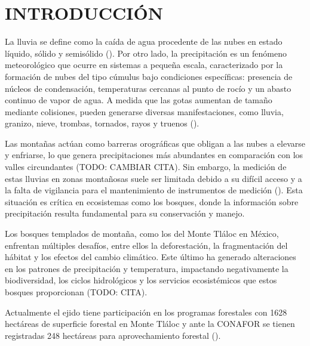 \chapter{INTRODUCCIÓN}
\setcounter{page}{1}
La lluvia se define como la caída de agua procedente de las nubes en estado líquido, sólido y semisólido (\cite{breña2013}). Por otro lado, la precipitación es un fenómeno meteorológico que ocurre en sistemas a pequeña escala, caracterizado por la formación de nubes del tipo cúmulus bajo condiciones específicas: presencia de núcleos de condensación, temperaturas cercanas al punto de rocío y un abasto continuo de vapor de agua. A medida que las gotas aumentan de tamaño mediante colisiones, pueden generarse diversas manifestaciones, como lluvia, granizo, nieve, trombas, tornados, rayos y truenos (\cite{ahrens2020}).

Las montañas actúan como barreras orográficas que obligan a las nubes a elevarse y enfriarse, lo que genera precipitaciones más abundantes en comparación con los valles circundantes (TODO: CAMBIAR CITA). Sin embargo, la medición de estas lluvias  en zonas montañosas suele ser limitada debido a su difícil acceso y a la falta de vigilancia para el mantenimiento de instrumentos de medición (\cite{aparicio1992}). Esta situación es crítica en ecosistemas como los bosques, donde la información sobre precipitación resulta fundamental para su conservación y manejo.  


Los bosques templados de montaña, como los del Monte Tláloc en México, enfrentan múltiples desafíos, entre ellos la deforestación, la fragmentación del hábitat y los efectos del cambio climático. Este último ha generado alteraciones en los patrones de precipitación y temperatura, impactando negativamente la biodiversidad, los ciclos hidrológicos y los servicios ecosistémicos que estos bosques proporcionan (TODO: CITA).

Actualmente el ejido tiene participación en los programas forestales con 1628 hectáreas de superficie forestal en Monte Tláloc y ante la CONAFOR se tienen registradas 248 hectáreas para aprovechamiento forestal (\cite{nava2014}).


